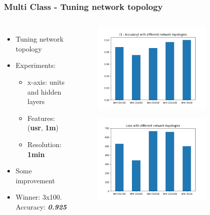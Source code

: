 \documentclass[aspectratio=169,11pt,hyperref={colorlinks=true}]{beamer}
\begin{document}
\begin{frame}
    \frametitle{Multi Class - Tuning network topology}
    \begin{columns}
        \begin{itemize}
            \item{Tuning network topology}
            \item{Experiments:}
            \begin{itemize}
              \item{x-axis: units and hidden layers}
              \item{Features: (\textbf{usr}, \textbf{1m})}
              \item{Resolution: \textbf{1min}}
            \end{itemize}
            \item{Some improvement}
            \item{Winner: 3x100. Accuracy: \emph{\textbf{0.925}}}
        \end{itemize}
        \begin{center}
        \begin{figure}
          \includegraphics[width=0.8\textwidth,height=0.4\textheight]{graphs/accuracy_by_topology-node_provider.png}
        \end{figure}
        \begin{figure}
          \includegraphics[width=0.8\textwidth,height=0.4\textheight]{graphs/loss_by_topology-node_provider.png}
        \end{figure}
        \end{center}
  \end{columns}
\end{frame}
\end{document}
